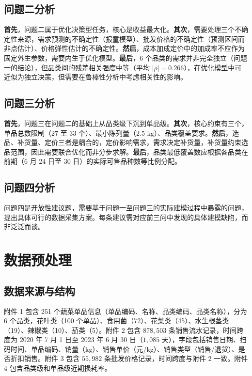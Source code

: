 \subsection{问题二分析}

\textbf{首先}，问题二属于优化决策型任务，核心是收益最大化。\textbf{其次}，需要处理三个不确定性来源，需求预测的不确定性（报童模型）、批发价格的不确定性（预测区间而非点估计）、价格弹性估计的不确定性。\textbf{然后}，成本加成定价中的加成率不应作为固定外生参数，需要内生于优化模型。\textbf{最后}，6 个品类的需求并非完全独立（问题一的结论），但品类间的残差相关强度中等（平均 $|\rho|=0.266$），在优化模型中可近似为独立决策，但需要在鲁棒性分析中考虑相关性的影响。

\subsection{问题三分析}

\textbf{首先}，问题三在问题二的基础上从品类级下沉到单品级。\textbf{其次}，核心约束有三个，单品总数限制（$27$ 至 $33$ 个）、最小陈列量（$2.5$ kg）、品类覆盖要求。\textbf{然后}，选品、补货量、定价三者是耦合的，定价影响需求，需求决定补货量，补货量约束选品范围，因此需要联合优化而非分步求解。\textbf{最后}，品类最低覆盖数应根据各品类在前期（6 月 24 日至 30 日）的实际可售品种数等比例分配。

\subsection{问题四分析}

问题四是开放性建议题，需要基于问题一至问题三的实际建模过程中暴露的问题，提出具体可行的数据采集方案。每条建议需对应前三问中发现的具体建模缺陷，而非泛泛而谈。

\section{数据预处理}

\subsection{数据来源与结构}

附件 1 包含 251 个蔬菜单品信息（单品编码、名称、品类编码、品类名称），分为 6 个品类，花叶类（100 个单品）、食用菌（72）、花菜类（45）、水生根茎类（19）、辣椒类（10）、茄类（5）。附件 2 包含 $878,503$ 条销售流水记录，时间跨度为 2020 年 7 月 1 日至 2023 年 6 月 30 日（$1,085$ 天），字段包括销售日期、扫码时间、单品编码、销量（kg）、销售单价（元/kg）、销售类型（销售/退货）、是否折扣销售。附件 3 包含 $55,982$ 条批发价格记录，时间跨度与附件 2 一致。附件 4 包含品类级和单品级近期损耗率。

